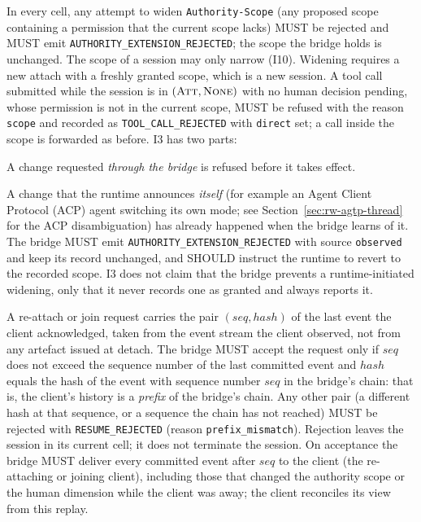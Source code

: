 \begin{invariant}\label{inv:I3}
In every cell, any attempt to widen \texttt{Authority-Scope} (any
proposed scope containing a permission that the current scope lacks)
MUST be rejected and MUST emit \texttt{AUTHORITY\_EXTENSION\_REJECTED};
the scope the bridge holds is unchanged. The scope of a session may only
narrow (I10). Widening requires a new attach with a freshly granted
scope, which is a new session. A tool call submitted while the session is
in $(\textsc{Att}, \textsc{None})$ with no human decision pending, whose
permission is not in the current scope, MUST be refused with the reason
\texttt{scope} and recorded as \texttt{TOOL\_CALL\_REJECTED} with
\texttt{direct} set; a call inside the scope is forwarded as before. I3 has two parts:
\begin{description}[leftmargin=2em]
\item[Enforced.] A change requested \emph{through the bridge} is refused
before it takes effect.
\item[Observed.] A change that the runtime announces \emph{itself} (for
example an Agent Client Protocol (ACP) agent switching its own mode; see
Section~\ref{sec:rw-agtp-thread} for the ACP disambiguation) has already happened when
the bridge learns of it. The bridge MUST emit
\texttt{AUTHORITY\_EXTENSION\_REJECTED} with source \texttt{observed}
and keep its record unchanged, and SHOULD instruct the runtime to revert
to the recorded scope. I3 does not claim that the bridge prevents a
runtime-initiated widening, only that it never records one as granted and
always reports it.
\end{description}
\end{invariant}

\begin{invariant}\label{inv:I4}
A re-attach or join request carries the pair $(\mathit{seq}, \mathit{hash})$ of
the last event the client acknowledged, taken from the event stream the
client observed, not from any artefact issued at detach. The bridge
MUST accept the request only if $\mathit{seq}$ does not exceed the
sequence number of the last committed event and $\mathit{hash}$ equals
the hash of the event with sequence number $\mathit{seq}$ in the bridge's
chain: that is, the client's history is a \emph{prefix} of the bridge's
chain. Any other pair (a different hash at that sequence, or a sequence
the chain has not reached) MUST be rejected with
\texttt{RESUME\_REJECTED} (reason \texttt{prefix\_mismatch}). Rejection
leaves the session in its current cell; it does not terminate the
session. On acceptance the bridge MUST deliver every committed event
after $\mathit{seq}$ to the client (the re-attaching or joining client),
including those that changed the
authority scope or the human dimension while the client was away; the
client reconciles its view from this replay.
\end{invariant}


